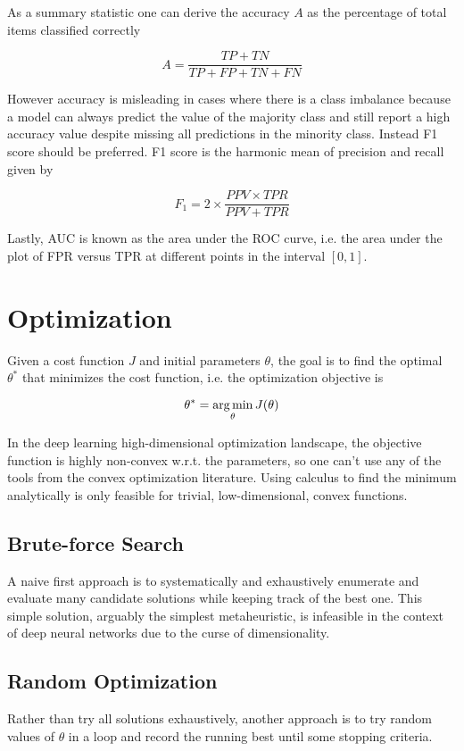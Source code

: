As a summary statistic one can derive the accuracy $A$ as the percentage of total items classified correctly

$$
A = \frac{TP + TN}{TP + FP + TN + FN}
$$

However accuracy is misleading in cases where there is a class imbalance because a model can always predict the value of the majority class and still report a high accuracy value despite missing all predictions in the minority class. Instead F1 score should be preferred. F1 score is the harmonic mean of precision and recall given by

$$
F_1 = 2 \times \frac{PPV \times TPR}{PPV + TPR}
$$

Lastly, \ac{AUC} is known as the area under the \ac{ROC} curve, i.e. the area under the plot of \ac{FPR} versus \ac{TPR} at different points in the interval $[0, 1]$.

\section{Optimization}

Given a cost function $J$ and initial parameters $\theta$, the goal is to find the optimal $\theta^*$ that minimizes the cost function, i.e. the optimization objective is

$$
\theta^{*} = \operatorname*{arg\,min}_{\theta} J(\theta)
$$

In the deep learning high-dimensional optimization landscape, the objective function is highly non-convex w.r.t. the parameters, so one can't use any of the tools from the convex optimization literature. Using calculus to find the minimum analytically is only feasible for trivial, low-dimensional, convex functions.

\subsection{Brute-force Search}

A naive first approach is to systematically and exhaustively enumerate and evaluate many candidate solutions while keeping track of the best one. This simple solution, arguably the simplest metaheuristic, is infeasible in the context of deep neural networks due to the curse of dimensionality.

\subsection{Random Optimization}

Rather than try all solutions exhaustively, another approach is to try random values of $\theta$ in a loop and record the running best until some stopping criteria.

